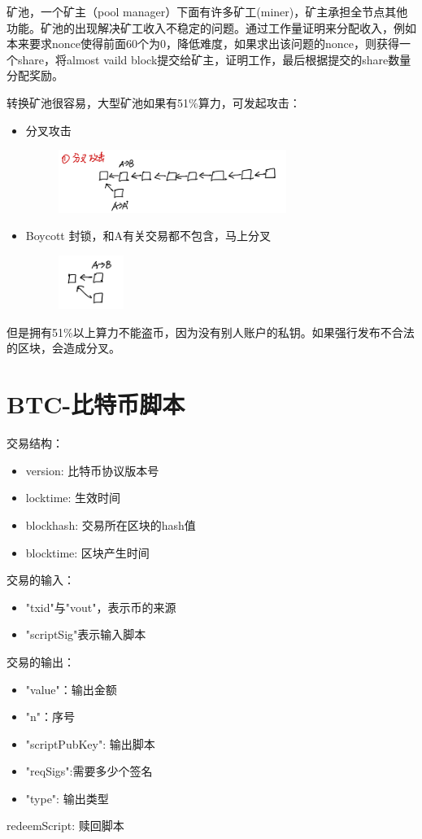 \documentclass[10pt]{ctexart}
\begin{document}
矿池，一个矿主（pool manager）下面有许多矿工(miner)，矿主承担全节点其他功能。矿池的出现解决矿工收入不稳定的问题。通过工作量证明来分配收入，例如本来要求nonce使得前面60个为0，降低难度，如果求出该问题的nonce，则获得一个share，将almost vaild block提交给矿主，证明工作，最后根据提交的share数量分配奖励。

转换矿池很容易，大型矿池如果有51\%算力，可发起攻击：
\begin{itemize}
    \item 分叉攻击
    \begin{figure}[H]
        \centering
        \includegraphics[width=0.7\textwidth]{./lecture8/img1.png} 
    \end{figure}
    \item Boycott 封锁，和A有关交易都不包含，马上分叉
    \begin{figure}[H]
        \centering
        \includegraphics[width=0.2\textwidth]{./lecture8/img2.png} 
    \end{figure}
\end{itemize}
但是拥有51\%以上算力不能盗币，因为没有别人账户的私钥。如果强行发布不合法的区块，会造成分叉。

  
\section{BTC-比特币脚本}
交易结构：
\begin{itemize}
    \item version: 比特币协议版本号
    \item locktime: 生效时间
    \item blockhash: 交易所在区块的hash值
    \item blocktime: 区块产生时间
\end{itemize}
交易的输入：
\begin{itemize}
    \item "txid"与"vout"，表示币的来源
    \item "scriptSig"表示输入脚本
\end{itemize}
交易的输出：
\begin{itemize}
    \item "value"：输出金额
    \item "n"：序号
    \item "scriptPubKey": 输出脚本
    \item "reqSigs":需要多少个签名
    \item "type": 输出类型
\end{itemize}
redeemScript: 赎回脚本
\end{document}
